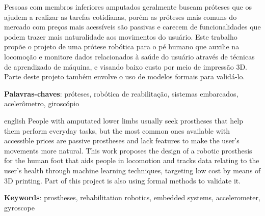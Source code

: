 \documentclass[
    12pt,       %
    oneside,    %
    a4paper,    %
%
    chapter=TITLE,	  	  %
%
    english,			  %
    brazil				  %
%
]{abntex2}
\begin{document}
\setlength{\absparsep}{18pt} %

\begin{resumo}[Resumo]
  Pessoas com membros inferiores amputados geralmente buscam próteses que os ajudem a realizar as tarefas cotidianas, porém as próteses mais comuns do mercado com preços mais acessíveis são passivas e carecem de funcionalidades que podem trazer mais naturalidade aos movimentos do usuário. Este trabalho propõe o projeto de uma prótese robótica para o pé humano que auxilie na locomoção e monitore dados relacionados à saúde do usuário através de técnicas de aprendizado de máquina, e visando baixo custo por meio de impressão 3D. Parte deste projeto também envolve o uso de modelos formais para validá-lo.

 \vspace{\onelineskip}

 \noindent
 \textbf{Palavras-chaves}: próteses, robótica de reabilitação, sistemas embarcados, acelerômetro, giroscópio
\end{resumo}


\begin{resumo}[Abstract]
 \begin{otherlanguage*}{english}
   People with amputated lower limbs usually seek prostheses that help them perform everyday tasks, but the most common ones available with accessible prices are passive prostheses and lack features to make the user's movements more natural. This work proposes the design of a robotic prosthesis for the human foot that aids people in locomotion and tracks data relating to the user's health through machine learning techniques, targeting low cost by means of 3D printing. Part of this project is also using formal methods to validate it.
  
  \vspace{\onelineskip}

    \noindent
    \textbf{Keywords}: prostheses, rehabilitation robotics, embedded systems, accelerometer, gyroscope
 \end{otherlanguage*}
\end{resumo}
\end{document}
